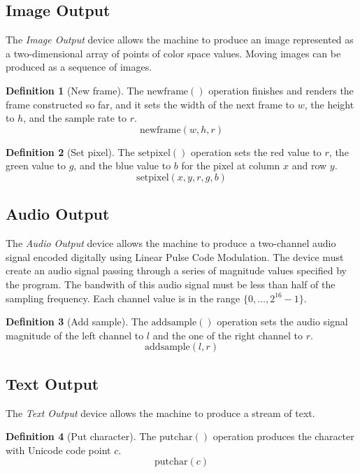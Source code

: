 \documentclass[a4paper,10pt]{article}
\newcommand{\range}[2]{\{#1,\ldots,#2\}}
\newcommand{\PutChar}[1]{\mathrm{putchar}(#1)}
\newcommand{\AddSample}[1]{\mathrm{addsample}(#1)}
\newcommand{\SetPixel}[1]{\mathrm{setpixel}(#1)}
\newcommand{\NewFrame}[1]{\mathrm{newframe}(#1)}
\theoremstyle{definition}
\newtheorem{definition}{Definition}
\begin{document}
\subsection{Image Output}
\label{sec:image-output}

The \emph{Image Output} device allows the machine to produce an image represented as a two-dimensional array of points of color space values.
Moving images can be produced as a sequence of images.

\begin{definition}[New frame]
  The $\NewFrame{}$ operation finishes and renders the frame constructed so far, and it sets the width of the next frame to $w$, the height to $h$, and the sample rate to $r$.
  \[ \NewFrame{w, h, r} \]
\end{definition}

\begin{definition}[Set pixel]
  The $\SetPixel{}$ operation sets the red value to $r$, the green value to $g$, and the blue value to $b$ for the pixel at column $x$ and row $y$.
  \[ \SetPixel{x, y, r, g, b} \]
\end{definition}

\subsection{Audio Output}
\label{sec:audio-output}

The \emph{Audio Output} device allows the machine to produce a two-channel audio signal encoded digitally using Linear Pulse Code Modulation.
The device must create an audio signal passing through a series of magnitude values specified by the program.
The bandwith of this audio signal must be less than half of the sampling frequency.
Each channel value is in the range $\range{0}{2^{16}-1}$.

\begin{definition}[Add sample]
  The $\AddSample{}$ operation sets the audio signal magnitude of the left channel to $l$ and the one of the right channel to $r$.
\[ \AddSample{l, r} \]
\end{definition}

\subsection{Text Output}
\label{sec:text-output}

The \emph{Text Output} device allows the machine to produce a stream of text.

\begin{definition}[Put character]
  The $\PutChar{}$ operation produces the character with Unicode code point $c$.
  \[ \PutChar{c} \]
\end{definition}
\end{document}
